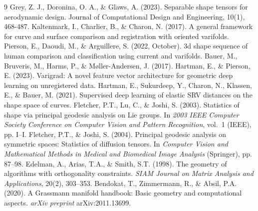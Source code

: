 \documentclass[11pt]{article}
\begin{document}
\begin{thebibliography}{9}
 Grey, Z. J., Doronina, O. A., \& Glaws, A. (2023). Separable shape tensors for aerodynamic design. Journal of Computational Design and Engineering, 10(1), 468-487.
 Kaltenmark, I., Charlier, B., \& Charon, N. (2017). A general framework for curve and surface comparison and registration with oriented varifolds.
 Pierson, E., Daoudi, M., \& Arguillere, S. (2022, October). 3d shape sequence of human comparison and classification using current and varifolds. 
 Bauer, M., Bruveris, M., Harms, P., \& Møller-Andersen, J. (2017).
 Hartman, E., \& Pierson, E. (2023). Varigrad: A novel feature vector architecture for geometric deep learning on unregistered data. 
 Hartman, E., Sukurdeep, Y., Charon, N., Klassen, E., \& Bauer, M. (2021). Supervised deep learning of elastic SRV distances on the shape space of curves.
 Fletcher, P.T., Lu, C., \& Joshi, S. (2003). Statistics of shape via principal geodesic analysis on Lie groups. In \emph{2003 IEEE Computer Society Conference on Computer Vision and Pattern Recognition}, vol.~1 (IEEE), pp. I--I.
 Fletcher, P.T., \& Joshi, S. (2004). Principal geodesic analysis on symmetric spaces: Statistics of diffusion tensors. In \emph{Computer Vision and Mathematical Methods in Medical and Biomedical Image Analysis} (Springer), pp. 87--98.
 Edelman, A., Arias, T.A., \& Smith, S.T. (1998). The geometry of algorithms with orthogonality constraints. \emph{SIAM Journal on Matrix Analysis and Applications}, 20(2), 303--353.
 Bendokat, T., Zimmermann, R., \& Absil, P.A. (2020). A Grassmann manifold handbook: Basic geometry and computational aspects. \emph{arXiv preprint} arXiv:2011.13699.
\end{thebibliography}
\end{document}
